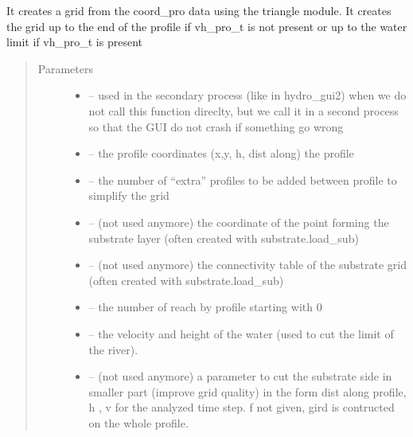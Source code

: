 \documentclass[letterpaper,10pt,english]{sphinxmanual}
\begin{document}
\begin{fulllineitems}
\label{\detokenize{index:src.manage_grid_8.create_grid}}
It creates a grid from the coord\_pro data using the triangle module.
It creates the grid up to the end of the profile if vh\_pro\_t is not present
or up to the water limit if vh\_pro\_t is present
\begin{quote}\begin{description}
\item[{Parameters}] \leavevmode\begin{itemize}
\item {} 
 -- used in the secondary process (like in hydro\_gui2) when we do not call this function direclty, but we
call it in a second process so that the GUI do not crash if something go wrong

\item {} 
 -- the profile coordinates (x,y, h, dist along) the profile

\item {} 
 -- the number of ``extra'' profiles to be added between profile to simplify the grid

\item {} 
 -- (not used anymore)
the coordinate of the point forming the substrate layer (often created with substrate.load\_sub)

\item {} 
 -- (not used anymore)
the connectivity table of the substrate grid (often created with substrate.load\_sub)

\item {} 
 -- the number of reach by profile starting with 0

\item {} 
 -- the velocity and height of the water (used to cut the limit of the river).

\item {} 
 -- (not used anymore) a parameter to cut the substrate side in smaller part (improve grid quality)
in the form dist along profile, h , v for the analyzed time step. f not given, gird is contructed on the whole profile.


\end{itemize}
\end{description}
\end{quote}
\end{fulllineitems}
\end{document}
